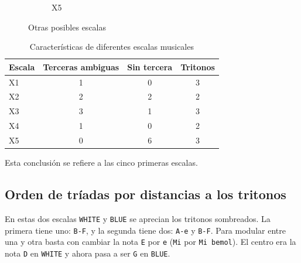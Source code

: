 \documentclass[]{report}
\begin{document}
\begin{figure}[H]
\begin{subfigure}{0.15\textwidth}
		\caption{\textsf{X5}}

	\end{subfigure}
	\hfill
	\caption{Otras posibles escalas}\label{fig:more-posible-scales}
\end{figure}

\begin{table}[H]
	\centering
	\begin{tabular}{lccc}
		\toprule
		Escala & Terceras ambiguas & Sin tercera & Tritonos \\
		\midrule
		X1     & 1                 & 0           & 3        \\
		X2     & 2                 & 2           & 2        \\
		X3     & 3                 & 1           & 3        \\
		X4     & 1                 & 0           & 2        \\
		X5     & 0                 & 6           & 3        \\
		\bottomrule
	\end{tabular}
	\caption{Características de diferentes escalas musicales}\label{tab:escalas}
\end{table}

Esta conclusión se refiere a las cinco primeras escalas.

\subsection{Orden de tríadas por distancias a los tritonos}

En estas dos escalas \texttt{WHITE} y \texttt{BLUE} se aprecian los tritonos sombreados. La primera tiene uno: \texttt{B-F}, y la segunda tiene dos: \texttt{A-e} y \texttt{B-F}. Para modular entre una y otra basta con cambiar la nota \texttt{E} por \texttt{e} (\texttt{Mi} por \texttt{Mi\ bemol}). El centro era la nota \texttt{D} en \texttt{WHITE} y ahora pasa a ser \texttt{G} en \texttt{BLUE}.
\end{document}
